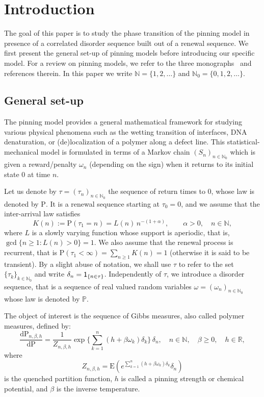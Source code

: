 \documentclass[11pt]{article}
\theoremstyle{definition}
\numberwithin{equation}{section}
\numberwithin{figure}{section}
\numberwithin{table}{section}
\newcommand{\bbN}{{\ensuremath{\mathbb N}}}
\newcommand{\bbP}{{\ensuremath{\mathbb P}}}
\newcommand{\bbR}{{\ensuremath{\mathbb R}}}
\newcommand{\ga}{\alpha}
\newcommand{\gb}{\beta}
\newcommand{\gd}{\delta}
\newcommand{\go}{\omega}
\newcommand{\dd}{\mathrm{d}}
\newcommand\bP{\ensuremath{\mathrm{P}}}
\newcommand\bE{\ensuremath{\mathrm{E}}}
\newcommand{\ind}{{\sf 1}}
\begin{document}
\section{Introduction}

The goal of this paper is to study the phase transition of the pinning model in presence of a correlated disorder sequence built out of a renewal sequence. We first present the general set-up of pinning models before introducing our specific model. For a review on pinning models, we refer to the three monographs~\cite{Gi2007, Gi2011, dH09} and references therein. In this paper we write $\bbN = \{1, 2, \ldots\}$ and $\bbN_0 = \{0, 1, 2,\ldots\}$.

\subsection{General set-up}

The pinning model provides a general mathematical framework for studying various physical phenomena such as the wetting transition of interfaces, DNA denaturation, or (de)localization of a polymer along a defect line. This statistical-mechanical model is formulated in terms of a Markov chain $(S_n)_{n\in\bbN_0}$ which is given a reward/penalty $\omega_n$ (depending on the sign) when it returns to its initial state $0$ at time $n$.

Let us denote by $\tau = (\tau_n)_{n\in\bbN_0}$ the sequence of return times to $0$, whose law is denoted by $\bP$. It is a renewal sequence starting at $\tau_0 = 0$, and we assume that the inter-arrival law satisfies
\begin{equation}\label{eq:defK_regvar}
K(n) := \bP(\tau_1 = n) = L(n) \, n^{- (1 + \ga)},\qquad \ga > 0,\quad n\in\bbN,
\end{equation}
where $L$ is a slowly varying function whose support is aperiodic, that is, $\gcd\{n \geq 1 \colon L(n) > 0\}= 1$. We also assume that the renewal process is recurrent, that is $\bP(\tau_1 < \infty) = \sum_{n\ge 1} K(n) = 1$ (otherwise it is said to be transient). By a slight abuse of notation, we shall use $\tau$ to refer to the set $\{\tau_k\}_{k\in\bbN_0}$ and write $\gd_n = \ind_{\{n\in\tau\}}$. Independently of $\tau$, we introduce a disorder sequence, that is a sequence of real valued random variables $\go = (\go_n)_{n\in \bbN_0}$ whose law is denoted by $\bbP$.

The object of interest is the sequence of Gibbs measures, also called polymer measures, defined by:
\begin{equation}\label{eq:defquemeas}
\frac{\dd \bP_{n,\gb,h}}{\dd \bP} = \frac{1}{Z_{n,\gb,h}} \exp \bigg\{\sum_{k=1}^n (h + \gb \go_k)\gd_k \bigg\} \,\gd_n, \quad n \in \bbN, \quad \gb \geq 0, \quad h \in \bbR,
\end{equation}
where
\begin{equation}\label{eq:defquepf}
Z_{n,\gb,h} = \bE \left(e^{\sum_{k=1}^n (h + \gb \go_k) \gd_k} \gd_n \right)
\end{equation}
is the quenched partition function, $h$ is called a pinning strength or chemical potential, and $\gb$ is the inverse temperature.
\end{document}
